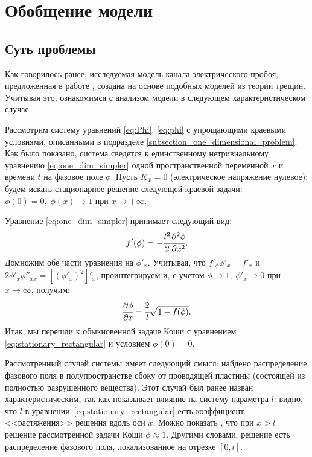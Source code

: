
\section{Обобщение модели}

\subsection{Суть проблемы}

Как говорилось ранее, исследуемая модель канала электрического пробоя, предложенная в работе \cite{pitike_dielectric_breakdown}, создана на основе подобных моделей из теории трещин. Учитывая это, ознакомимся с анализом модели в следующем характеристическом случае.

Рассмотрим систему уравнений \eqref{eq:Phi}, \eqref{eq:phi} с упрощающими краевыми условиями, описанными в подразделе \ref{subsection_one_dimensional_problem}. Как было показано, система сведется к единственному нетривиальному уравнению \eqref{eq:one_dim_simpler} одной пространственной переменной $x$ и времени $t$ на фазовое поле $\phi$. Пусть $K_\Phi = 0$ (электрическое напряжение нулевое); будем искать стационарное решение следующей краевой задачи: $\phi(0) = 0, \; \phi(x) \to 1$ при $x \to +\infty$.

Уравнение \eqref{eq:one_dim_simpler} принимает следующий вид:
$$f'(\phi) = - \cfrac{l^2}{2} \cfrac{\partial^2 \phi}{\partial x^2} {\text{.}}$$
Домножим обе части уравнения на $\phi'_x$. Учитывая, что $f'_\phi \phi'_x = f'_x$ и $2 \phi'_x \phi''_{xx} = [(\phi'_x)^2]'_x$, проинтегрируем и, с учетом $\phi \to 1, \; \phi'_x \to 0$ при $x \to \infty$, получим:
\begin{equation}
    \cfrac{\partial \phi}{\partial x} = \cfrac{2}{l} \sqrt{1 - f(\phi)} {\text{.}}
    \label{eq:stationary_rectangular}
\end{equation}
Итак, мы перешли к обыкновенной задаче Коши с уравнением \eqref{eq:stationary_rectangular} и условием $\phi(0) = 0$.

Рассмотренный случай системы имеет следующий смысл: найдено распределение фазового поля в полупространстве сбоку от проводящей пластины (состоящей из полностью разрушенного вещества). Этот случай был ранее назван характеристическим, так как показывает влияние на систему параметра $l$: видно, что $l$ в уравнении~\eqref{eq:stationary_rectangular} есть коэффициент <<растяжения>> решения вдоль оси $x$. Можно показать \cite{zipunova_higher_codimension}, что при $x > l$ решение рассмотренной задачи Коши $\phi \approx 1$. Другими словами, решение есть распределение фазового поля, локализованное на отрезке $[0, l]$.


